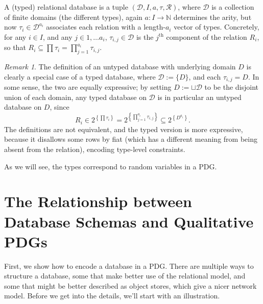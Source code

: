 \documentclass{article}
\theoremstyle{definition}
\theoremstyle{remark}
\newtheorem*{remark}{Remark}
\begin{document}
\begin{defn}
    A (typed) relational database is a tuple $(\mathcal D, I, a, \tau, \mathcal R)$, where
    $\mathcal D$ is a collection of finite domains (the different types), again
    $a: I \to \mathbb N$ determines the arity, but now $\tau_i \in \mathcal
    D^{a_i}$ associates each relation with a length-$a_i$ vector of types. 
    Concretely, for any $i \in I$, and any $j \in 1, \ldots a_i$, $\tau_{i,j}
    \in \mathcal D$ is the $j^{\text{th}}$ component of the relation $R_i$, so
    that  $R_i \subseteq \prod \tau_i = \prod_{j =1}^{a_i} \tau_{i,j}.$
\end{defn}

\begin{remark}
    The definition of an untyped database with underlying domain $D$ is clearly a special case of a typed database, where $\mathcal D := \{ D \}$, and each $\tau_{i,j} = D$. 
    In some sense, the two are equally expressive; by setting $D := \sqcup \mathcal D$ to be the disjoint union of each domain, any typed database on $\mathcal D$ is in particular an untyped database on $D$, since
    \[R_i \in 2^{\left\{\prod \tau_i\right\}} = 2^{\left\{\prod_{j =1}^{a_i} \tau_{i,j}\right\}} 
        \subseteq 2^{\left\{D^{a_i}\right\}} .\] 
  	The definitions are not equivalent, and the typed version is more expressive, because it disallows some rows by fiat (which has a different meaning from being absent from the relation), encoding type-level constraints. 
\end{remark}

As we will see, the types correspond to random variables in a PDG.

\section{The Relationship between Database Schemas and Qualitative PDGs}

First, we show how to encode a database in a PDG. There are multiple ways to structure a database, some that make better use of the relational model, and some that might be better described as object stores, which give a nicer network model. 
Before we get into the details, we'll start with an illustration. 
\end{document}
